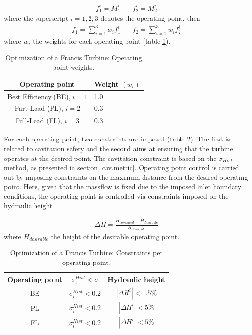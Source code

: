 \begin{eqnarray}
   f_1^i=M_1^i ~~~,~~~ f_2^i=M_2^i 
   \label{ObjFrancis} 
\end{eqnarray}
where the superscript $i=1,2,3$ denotes the operating point, then
\begin{eqnarray}
   f_1=\sum^3_{i=1}w_if_1^i ~~~,~~~ f_2=\sum^3_{i=1}w_if_2^i 
   \label{ObjFrancis2} 
\end{eqnarray}
where $w_i$ the weights for each operating point (table \ref{op-weights}).


\begin{table}[h!]
\begin{center}
\begin{tabular}{ |c|l| }
\hline
Operating point& Weight $(w_i)$\\
\hline
Best Efficiency (BE), $i=1$ & 1.0\\
\hline
Part-Load (PL), $i=2$ & 0.3\\
\hline
Full-Load (FL), $i=3$ & 0.3\\
\hline
\end{tabular}
\caption{Optimization of a Francis Turbine: Operating point weights.}
\label{op-weights}
\end{center}
\end{table}


For each operating point, two constraints are imposed (table \ref{Cons}). The first is related to cavitation safety and the second aims at ensuring that the turbine operates at the desired point. The cavitation constraint is based on the $\sigma_{Hist}$ method, as presented in section \ref{cav.metric}. Operating point control is carried out by imposing constraints on the maximum distance from the desired operating point. Here, given that the massflow is fixed due to the imposed inlet boundary conditions, the operating point is controlled via constraints imposed on the hydraulic height 


\begin{eqnarray}
   \Delta H=\frac{H_{computed}-H_{desirable}}{H_{desirable}} 
   \label{ConstFrancis} 
\end{eqnarray}
where $H_{desirable}$ the height of the desirable operating point.

\begin{table}[h!]
\begin{center}
\begin{tabular}{ |c|c|c| }
\hline
Operating point & $\sigma_i^{Hist}<\sigma$ & Hydraulic height\\
\hline
BE & $\sigma_i^{Hist}<0.2$ & $|\Delta H^i|<1.5\%$\\
\hline
PL       & $\sigma_i^{Hist}<0.2$ & $|\Delta H^i|<5\%$\\
\hline
FL       & $\sigma_i^{Hist}<0.2$ & $|\Delta H^i|<5\%$\\
\hline
\end{tabular}
\caption{Optimization of a Francis Turbine: Constraints per operating point.}
\label{Cons}
\end{center}
\end{table}


